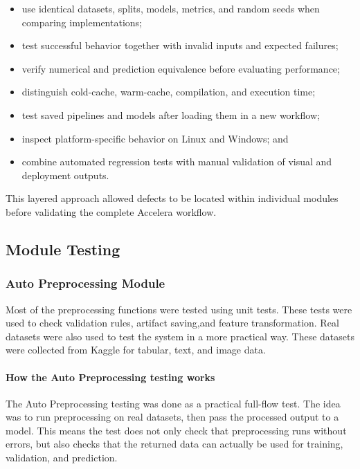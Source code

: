 \documentclass[12pt,a4paper]{report}
\begin{document}
\begin{itemize}
    \item use identical datasets, splits, models, metrics, and random seeds when
    comparing implementations;
    \item test successful behavior together with invalid inputs and expected
    failures;
    \item verify numerical and prediction equivalence before evaluating
    performance;
    \item distinguish cold-cache, warm-cache, compilation, and execution time;
    \item test saved pipelines and models after loading them in a new workflow;
    \item inspect platform-specific behavior on Linux and Windows; and
    \item combine automated regression tests with manual validation of visual
    and deployment outputs.
\end{itemize}

This layered approach allowed defects to be located within individual modules
before validating the complete Accelera workflow.


\subsection{Module Testing}

\subsubsection{Auto Preprocessing Module}
Most of the preprocessing functions were tested using unit tests. These tests
were used to check validation rules, artifact saving,and feature transformation. Real datasets were also used to test the system in a
more practical way. These datasets were collected from Kaggle for tabular,
text, and image data.
\paragraph{How the Auto Preprocessing testing works}

The Auto Preprocessing testing was done as a practical full-flow test. The idea
was to run preprocessing on real datasets, then pass the processed output to a
model. This means the test does not only check that preprocessing runs without
errors, but also checks that the returned data can actually be used for
training, validation, and prediction.
\end{document}
